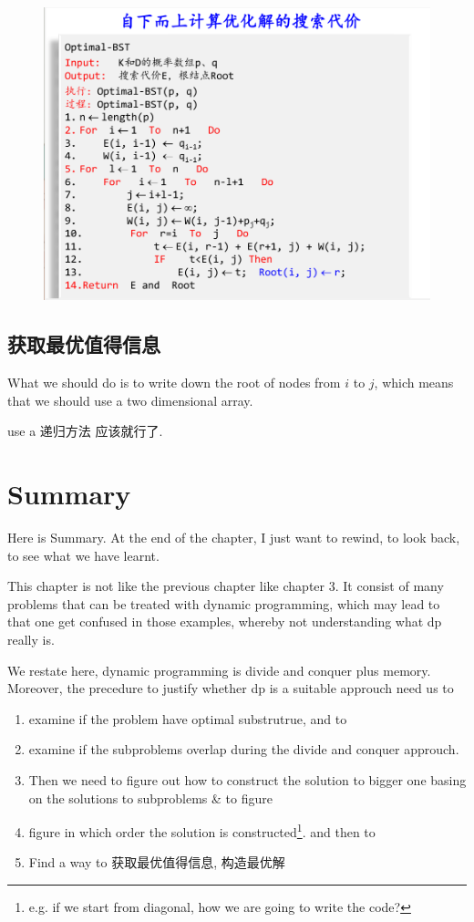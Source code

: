 \documentclass[a4paper, 10pt]{ctexart} %
\begin{document}
\begin{figure}[H]
    \centering
    \includegraphics[scale =0.5]{15.png}
\end{figure}


\subsection{获取最优值得信息}
What we should do is to write down the 
root of nodes from $i$ to $j$, which means that 
we should use a two dimensional array.

use a 递归方法 应该就行了.

\section{Summary}
Here is Summary. At the end of the chapter, I just want to rewind, to look back,
to see what we have learnt. 

This chapter is not like the previous chapter like chapter 3. It consist of many problems that can be 
treated with dynamic programming, which may lead to that 
one get confused in those examples, whereby not understanding what dp really is.

We restate here, dynamic programming is divide and conquer plus memory. 
Moreover, the precedure to justify whether dp is a suitable approuch need us 
to 
\begin{enumerate}
    \item 
examine if the problem have optimal substrutrue, and to  
\item
examine if
the subproblems overlap during the divide and conquer approuch. 
\item
Then 
we need to figure out how to construct the
solution to bigger one basing on the solutions to subproblems \& to figure 
    
\item 
figure in which order the solution is constructed\footnote{e.g. if we start from diagonal, how we are going to write the code?}. and then to
\item 
Find a way to 获取最优值得信息, 构造最优解
\end{enumerate}
\end{document}
